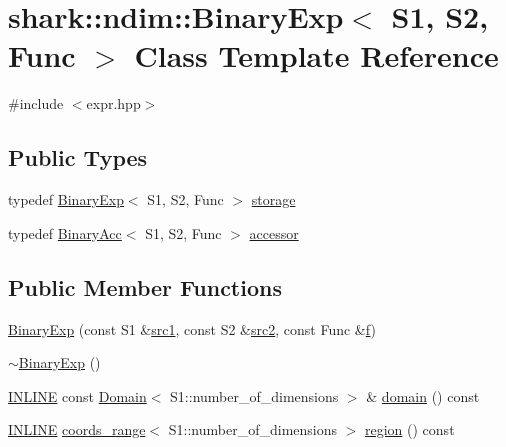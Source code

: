 \hypertarget{classshark_1_1ndim_1_1_binary_exp}{}\section{shark\+:\+:ndim\+:\+:Binary\+Exp$<$ S1, S2, Func $>$ Class Template Reference}
\label{classshark_1_1ndim_1_1_binary_exp}


{\ttfamily \#include $<$expr.\+hpp$>$}

\subsection*{Public Types}
\begin{DoxyCompactItemize}
\item 
typedef \hyperlink{classshark_1_1ndim_1_1_binary_exp}{Binary\+Exp}$<$ S1, S2, Func $>$ \hyperlink{classshark_1_1ndim_1_1_binary_exp_a4bab60eae0f72585742abcc3b988fa5b}{storage}
\item 
typedef \hyperlink{classshark_1_1ndim_1_1_binary_acc}{Binary\+Acc}$<$ S1, S2, Func $>$ \hyperlink{classshark_1_1ndim_1_1_binary_exp_a50255b11a4422c310fb6042fbc5bd306}{accessor}
\end{DoxyCompactItemize}
\subsection*{Public Member Functions}
\begin{DoxyCompactItemize}
\item 
\hyperlink{classshark_1_1ndim_1_1_binary_exp_a01a64057abf9d21a81f3718ce94adf7b}{Binary\+Exp} (const S1 \&\hyperlink{classshark_1_1ndim_1_1_binary_exp_adca0646eb1ee123dc4312644a39ffdb6}{src1}, const S2 \&\hyperlink{classshark_1_1ndim_1_1_binary_exp_a42495dbe9f1fdc13b53fc53d21c847a1}{src2}, const Func \&\hyperlink{classshark_1_1ndim_1_1_binary_exp_a96d3a36d75f44be439e3550d40135714}{f})
\item 
\hyperlink{classshark_1_1ndim_1_1_binary_exp_a99f2360463738318d1b5c67db1f60252}{$\sim$\+Binary\+Exp} ()
\item 
\hyperlink{common_8hpp_a2eb6f9e0395b47b8d5e3eeae4fe0c116}{I\+N\+L\+I\+NE} const \hyperlink{classshark_1_1ndim_1_1_domain}{Domain}$<$ S1\+::number\+\_\+of\+\_\+dimensions $>$ \& \hyperlink{classshark_1_1ndim_1_1_binary_exp_a127cbe45d16879c4f83361c7d045ba12}{domain} () const
\item 
\hyperlink{common_8hpp_a2eb6f9e0395b47b8d5e3eeae4fe0c116}{I\+N\+L\+I\+NE} \hyperlink{structshark_1_1ndim_1_1coords__range}{coords\+\_\+range}$<$ S1\+::number\+\_\+of\+\_\+dimensions $>$ \hyperlink{classshark_1_1ndim_1_1_binary_exp_a21f5512d10d29011d7ec82585cea5022}{region} () const
\end{DoxyCompactItemize}
